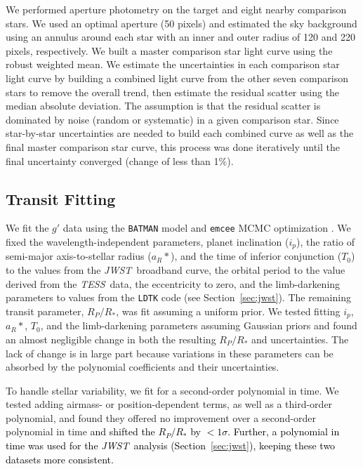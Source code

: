 \documentclass[twocolumn]{aastex63} %
\newcommand{\tess}{\textit{TESS}}
\newcommand{\jwst}{\textit{JWST}}
\newcommand{\newedit}[1]{\textcolor{black}{#1}}
\begin{document}
We performed aperture photometry on the target and eight nearby comparison stars. We used an optimal aperture (50 pixels) and estimated the sky background using an annulus around each star with an inner and outer radius of 120 and 220 pixels, respectively. We built a master comparison star light curve using the robust weighted mean. We estimate the uncertainties in each comparison star light curve by building a combined light curve from the other seven comparison stars to remove the overall trend, then estimate the residual scatter using the median absolute deviation. The assumption is that the residual scatter is dominated by noise (random or systematic) in a given comparison star. Since star-by-star uncertainties are needed to build each combined curve as well as the final master comparison star curve, this process was done iteratively until the final uncertainty converged (change of less than 1\%). 


\subsection{Transit Fitting}

We fit the $g'$ data using the \texttt{BATMAN} model \citep{Kreidberg2015} and \texttt{emcee} MCMC optimization \citep{Foreman-Mackey2013}. We fixed the wavelength-independent parameters, planet inclination ($i_p$), the ratio of semi-major axis-to-stellar radius ($a_R*$), and the time of inferior conjunction ($T_0$) to the values from the \jwst\ broadband curve, the orbital period to the value derived from the \tess\ data, the eccentricity to zero, and the limb-darkening parameters to values from the \texttt{LDTK} code (see Section~\ref{sec:jwst}). The remaining transit parameter, $R_P/R_*$, was fit assuming a uniform prior. We tested fitting $i_p$, $a_R*$, $T_0$, and the limb-darkening parameters assuming Gaussian priors and found an almost negligible change in both the resulting $R_P/R_*$ and uncertainties. The lack of change is in large part because variations in these parameters can be absorbed by the polynomial coefficients and their uncertainties.

To handle stellar variability, we fit for a second-order polynomial in time. We tested adding airmass- or position-dependent terms, as well as a third-order polynomial, and found they offered no improvement over a second-order polynomial in time \citep[based on the Bayesian Information Criterion; ][]{schwarz1978_bic} \newedit{and shifted the $R_P/R_*$ by $<1\sigma$. Further, a polynomial in time was used for the \jwst\ analysis (Section~\ref{sec:jwst}), keeping these two datasets more consistent.}
\end{document}
